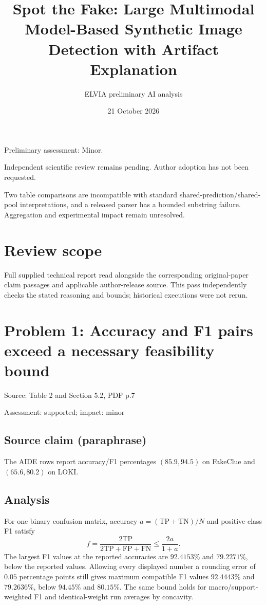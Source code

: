 \documentclass[11pt]{article}
\begin{document}
\title{Spot the Fake: Large Multimodal Model-Based Synthetic Image Detection with Artifact Explanation}

\author{ELVIA preliminary AI analysis}\date{21 October 2026}\maketitle

Preliminary assessment: Minor.\par

Independent scientific review remains pending. Author adoption has not been requested.

Two table comparisons are incompatible with standard shared-prediction/shared-pool interpretations, and a released parser has a bounded substring failure. Aggregation and experimental impact remain unresolved.

\section*{Review scope}

Full supplied technical report read alongside the corresponding original-paper claim passages and applicable author-release source. This pass independently checks the stated reasoning and bounds; historical executions were not rerun.

\section*{Problem 1: Accuracy and F1 pairs exceed a necessary feasibility bound}

Source: Table 2 and Section 5.2, PDF p.7

Assessment: supported; impact: minor

\subsection*{Source claim (paraphrase)}

The AIDE rows report accuracy/F1 percentages \((85.9,94.5)\) on FakeClue and \((65.6,80.2)\) on LOKI.

\subsection*{Analysis}

For one binary confusion matrix, accuracy \(a=(\mathrm{TP}+\mathrm{TN})/N\) and positive-class F1 satisfy \[f=\frac{2\mathrm{TP}}{2\mathrm{TP}+\mathrm{FP}+\mathrm{FN}}\leq\frac{2a}{1+a}.\] The largest F1 values at the reported accuracies are \(92.4153\%\) and \(79.2271\%\), below the reported values. Allowing every displayed number a rounding error of \(0.05\) percentage points still gives maximum compatible F1 values \(92.4443\%\) and \(79.2636\%\), below \(94.45\%\) and \(80.15\%\). The same bound holds for macro/support-weighted F1 and identical-weight run averages by concavity.
\end{document}
